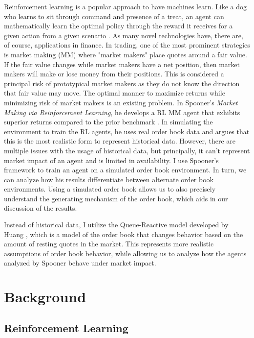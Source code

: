 \documentclass{article}
\begin{document}
Reinforcement learning is a popular approach to have machines learn. Like a dog who learns to sit through command and presence of a treat, an agent can mathematically learn the optimal policy through the reward it receives for a given action from a given scenario \citep{suttonbarto2018}. As many novel technologies have, there are, of course, applications in finance. In trading, one of the most prominent strategies is market making (MM) where "market makers" place quotes around a fair value. If the fair value changes while market makers have a net position, then market makers will make or lose money from their positions. This is considered a principal risk of prototypical market makers as they do not know the direction that fair value may move. The optimal manner to maximize returns while minimizing risk of market makers is an existing problem. In Spooner's \textit{Market Making via Reinforcement Learning}, he develops a RL MM agent that exhibits superior returns compared to the prior benchmark \citep{spooner2018}. In simulating the environment to train the RL agents, he uses real order book data and argues that this is the most realistic form to represent historical data. However, there are multiple issues with the usage of historical data, but principally, it can't represent market impact of an agent and is limited in availability. I use Spooner's framework to train an agent on a simulated order book environment. In turn, we can analyze how his results differentiate between alternate order book environments. Using a simulated order book allows us to also precisely understand the generating mechanism of the order book, which aids in our discussion of the results.

Instead of historical data, I utilize the Queue-Reactive model developed by Huang \citep{huang2015}, which is a model of the order book that changes behavior based on the amount of resting quotes in the market. This represents more realistic assumptions of order book behavior, while allowing us to analyze how the agents analyzed by Spooner behave under market impact.

\section{Background}

\subsection{Reinforcement Learning}
\end{document}

